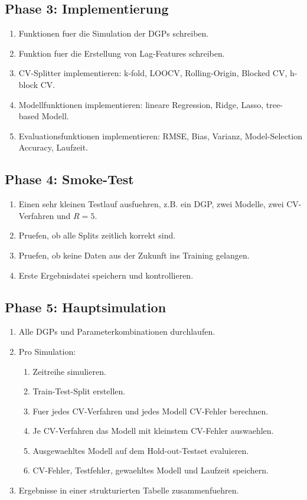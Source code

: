 \documentclass[11pt,a4paper]{article}
\begin{document}
\subsection{Phase 3: Implementierung}

\begin{enumerate}
  \item Funktionen fuer die Simulation der DGPs schreiben.
  \item Funktion fuer die Erstellung von Lag-Features schreiben.
  \item CV-Splitter implementieren:
  k-fold, LOOCV, Rolling-Origin, Blocked CV, h-block CV.
  \item Modellfunktionen implementieren:
  lineare Regression, Ridge, Lasso, tree-based Modell.
  \item Evaluationsfunktionen implementieren:
  RMSE, Bias, Varianz, Model-Selection Accuracy, Laufzeit.
\end{enumerate}

\subsection{Phase 4: Smoke-Test}

\begin{enumerate}
  \item Einen sehr kleinen Testlauf ausfuehren, z.B. ein DGP, zwei Modelle,
  zwei CV-Verfahren und $R = 5$.
  \item Pruefen, ob alle Splits zeitlich korrekt sind.
  \item Pruefen, ob keine Daten aus der Zukunft ins Training gelangen.
  \item Erste Ergebnisdatei speichern und kontrollieren.
\end{enumerate}

\subsection{Phase 5: Hauptsimulation}

\begin{enumerate}
  \item Alle DGPs und Parameterkombinationen durchlaufen.
  \item Pro Simulation:
  \begin{enumerate}
    \item Zeitreihe simulieren.
    \item Train-Test-Split erstellen.
    \item Fuer jedes CV-Verfahren und jedes Modell CV-Fehler berechnen.
    \item Je CV-Verfahren das Modell mit kleinstem CV-Fehler auswaehlen.
    \item Ausgewaehltes Modell auf dem Hold-out-Testset evaluieren.
    \item CV-Fehler, Testfehler, gewaehltes Modell und Laufzeit speichern.
  \end{enumerate}
  \item Ergebnisse in einer strukturierten Tabelle zusammenfuehren.
\end{enumerate}
\end{document}
